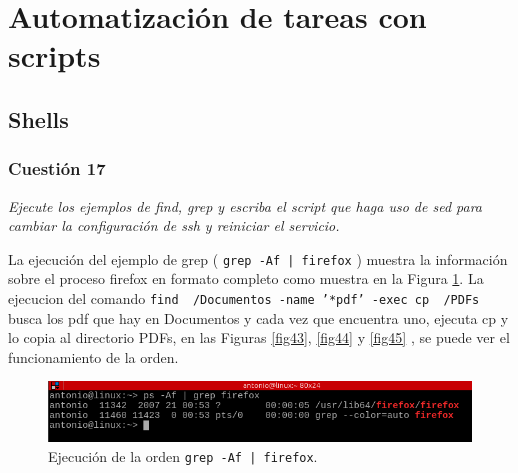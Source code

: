 \section{Automatización de tareas con scripts}
\subsection{Shells}
\subsubsection{Cuestión 17}
\textit{Ejecute los ejemplos de find, grep y escriba el script que haga uso de sed para cambiar la configuración de ssh y reiniciar el servicio.}

La ejecución del ejemplo de grep ( \texttt{grep -Af | firefox} ) muestra la información sobre el proceso firefox en formato completo como muestra en la Figura \ref{fig42}. La ejecucion del comando \texttt{find ~/Documentos -name '*pdf' -exec cp {} ~/PDFs \;} busca los pdf que hay en Documentos y cada vez que encuentra uno, ejecuta cp y lo copia al directorio PDFs, en las Figuras \ref{fig43}, \ref{fig44} y \ref{fig45} , se puede ver el funcionamiento de la orden.

\begin{figure}[H]
    \begin{center}
        \includegraphics[scale=0.6]{imagenes/img45}
        \caption{Ejecución de la orden \texttt{grep -Af | firefox}.}
        \label{fig42}
    \end{center}
\end{figure}


